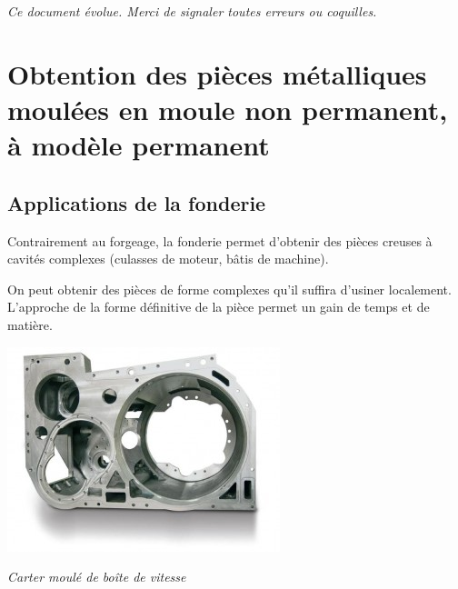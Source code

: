 \documentclass[11pt,oneside]{article}
\begin{document}
\tableofcontents

 \renewcommand{\baselinestretch}{1.2}
\setlength{\parskip}{2ex plus 0.5ex minus 0.2ex}

\textit{Ce document évolue. Merci de signaler toutes erreurs ou coquilles.}




\section{Obtention des pièces métalliques moulées en moule non permanent, à
modèle permanent}

\subsection{Applications de la fonderie}
\begin{minipage}[c]{.55\textwidth}
Contrairement au forgeage, la fonderie permet d'obtenir des pièces creuses à cavités complexes (culasses de moteur, bâtis de machine).

On peut obtenir des pièces de forme complexes qu'il suffira d'usiner
localement. L'approche de la forme définitive de la pièce permet un gain de
temps et de matière.
\end{minipage}\hfill
\begin{minipage}[c]{.4\textwidth}
\begin{center}
\includegraphics[width=.9\textwidth]{png/carter_moule}

\textit{Carter moulé de boîte de vitesse \cite{cartermoule}}
\end{center}
\end{minipage}
\end{document}
